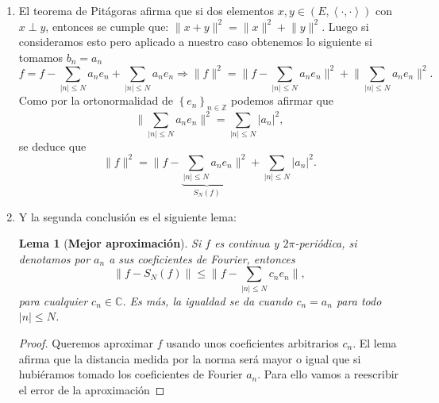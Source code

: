 \documentclass[12pt]{article}
\newcommand{\C}{\mathbb{C}}
\theoremstyle{plain}
\newtheorem{lema}[teorema]{Lema}
\theoremstyle{definition}
\numberwithin{equation}{section}
\begin{document}
            \begin{enumerate}
                \item[\textbf{(1)}] El teorema de Pitágoras afirma que si dos elementos \(x,y \in (E,\left\langle \cdot ,\cdot\right\rangle )\) con $x \perp y$, entonces se cumple que: \(\lVert x + y \rVert^2 = \lVert x \rVert^2 + \lVert y \rVert^2\). Luego si consideramos esto pero aplicado a nuestro caso obtenemos lo siguiente si tomamos \(b_n = a_n\)
                $$ f = f - \sum_{\left\lvert n\right\rvert \leq N } a_n e_n + \sum_{\left\lvert n\right\rvert \leq N } a_n e_n \Rightarrow \lVert f \rVert^2 = \lVert f - \sum_{\left\lvert n\right\rvert \leq N } a_n e_n\rVert^2 + \lVert \sum_{\left\lvert n\right\rvert \leq N } a_n e_n\rVert^2.$$ Como por la ortonormalidad de \(\left\{e_n\right\}_{n \in \mathbb{Z}}\) podemos afirmar que
                $$ \lVert \sum_{\left\lvert n\right\rvert \leq N } a_n e_n\rVert^2 = \sum_{\left\lvert n\right\rvert \leq N } \left\lvert a_n\right\rvert^2, $$ se deduce que
                \begin{equation}
                    \label{sum}
                    \lVert f \rVert^2 = \lVert f - \underbrace{\sum_{\left\lvert n\right\rvert \leq N } a_n e_n}_{\text{\(S_N(f)\)}} \rVert^2 + \sum_{\left\lvert n\right\rvert \leq N } \left\lvert a_n\right\rvert^2.
                \end{equation}
                \item[\textbf{(2)}] Y la segunda conclusión es el siguiente lema:
                \begin{lema}[\textbf{Mejor aproximación}]
                    \label{best}
                    Si \(f\) es continua y \(2\pi\)-periódica, si denotamos por \(a_n\) a sus coeficientes de Fourier, entonces
                    \begin{equation*}
                        \lVert f - S_N(f)\rVert \leq \lVert f - \sum_{\left\lvert n\right\rvert \leq N } c_n e_n \rVert,
                    \end{equation*}
                    para cualquier \(c_n \in \C\). Es más, la igualdad se da cuando \(c_n = a_n\) para todo \(\left\lvert n\right\rvert \leq N\).
                \end{lema}
                \begin{proof}
                    Queremos aproximar \(f\) usando unos coeficientes arbitrarios \(c_n\). El lema afirma que la distancia medida por la norma será mayor o igual que si hubiéramos tomado los coeficientes de Fourier \(a_n\).
                    Para ello vamos a reescribir el error de la aproximación

\end{proof}
\end{enumerate}
\end{document}
